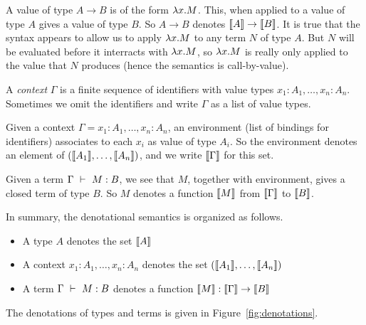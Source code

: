 A value of type $A \to B$ is of the form $\lambda x.M$. This, when
applied to a value of type $A$ gives a value of type $B$. So $A \to B$
denotes $\llbracket A\rrbracket \to \llbracket B\rrbracket$. It is true that the syntax appears to
allow us to apply $\lambda x.M$ to any term $N$ of type $A$. But $N$ will be
evaluated before it interracts with $\lambda x.M$, so $\lambda x.M$ is really only
applied to the value that $N$ produces (hence the semantics is call-by-value).

\begin{definition}
 A \emph{context} $\Gamma$ is a finite sequence of identifiers with value
 types $x_1:A_1, \dots ,x_n:A_n$. Sometimes we omit the identifiers and
 write $\Gamma$ as a list of value types.
\end{definition}

Given a context $\Gamma = x_1:A_1,\dots,x_n:A_n$, an environment (list of
bindings for identifiers) associates to each $x_i$ as value of type $A_i$. So
the environment denotes an element of $(\llbracket A_1\rrbracket,\dots,\llbracket A_n\rrbracket)$, and
we write $\llbracket\Gamma\rrbracket$ for this set.

Given a \corelang term $\Gamma~\vdash~M: B$, we see that $M$, together with
environment, gives a closed term of type $B$. So $M$ denotes a function
$\llbracket M\rrbracket$ from $\llbracket\Gamma\rrbracket$ to $\llbracket B\rrbracket$.

In summary, the denotational semantics is organized as follows.

\begin{itemize}
  \item A type $A$ denotes the set $\llbracket A\rrbracket$
  \item A context $x_1:A_1,\dots,x_n:A_n$ denotes the set $(\llbracket A_1\rrbracket,\dots,\llbracket A_n\rrbracket)$
  \item A term $\Gamma~\vdash~M: B$ denotes a function $\llbracket M\rrbracket:
  \llbracket\Gamma\rrbracket \to \llbracket B\rrbracket$
\end{itemize}

The denotations of types and terms is given in Figure~\ref{fig:denotations}.

